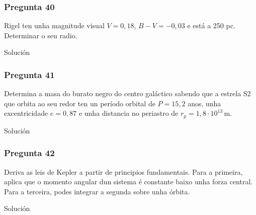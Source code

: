 \vspace*{2em}

\begin{Enunciado}
	\subsubsection{Pregunta 40}

	Rigel ten unha magnitude visual $V = 0{,}18$, $B - V = -0{,}03$ e está a 250 pc. Determinar o seu radio.

\end{Enunciado}
Solución

\vspace*{2em}

\begin{Enunciado}
	\subsubsection{Pregunta 41}

	Determina a masa do burato negro do centro galáctico sabendo que a estrela S2 que orbita ao seu redor ten un período orbital de $P = 15{,}2$ anos, unha excentricidade $e = 0{,}87$ e unha distancia no periastro de $r_p = 1{,}8 \cdot 10^{13}\,\text{m}$.

\end{Enunciado}
Solución

\vspace*{2em}

\begin{Enunciado}
	\subsubsection{Pregunta 42}

	Deriva as leis de Kepler a partir de principios fundamentais. Para a primeira, aplica que o momento angular dun sistema é constante baixo unha forza central. Para a terceira, podes integrar a segunda sobre unha órbita.

\end{Enunciado}
Solución

\vspace*{2em}

